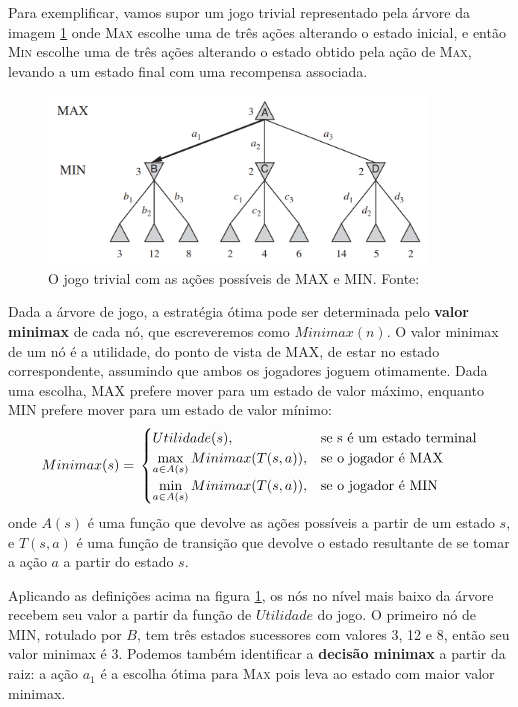 Para exemplificar, vamos supor um jogo trivial representado pela árvore da imagem \ref{minimax} onde \textsc{Max} escolhe uma de três ações alterando o estado inicial, e então \textsc{Min} escolhe uma de três ações alterando o estado obtido pela ação de \textsc{Max}, levando a um estado final com uma recompensa associada.

\begin{figure}[!h]
        \centering
            \includegraphics[width=0.9\textwidth]{picstcc/minimax.png}
            \caption{O jogo trivial com as ações possíveis de MAX e MIN. Fonte: \cite[p. 164]{livro}}
            \label{minimax}
\end{figure}

Dada a árvore de jogo, a estratégia ótima pode ser determinada pelo \textbf{valor minimax} de cada nó, que escreveremos como $Minimax(n)$. O valor minimax de um nó é a utilidade, do ponto de vista de MAX, de estar no estado correspondente, assumindo que ambos os jogadores joguem otimamente. Dada uma escolha, MAX prefere mover para um estado de valor máximo, enquanto MIN prefere mover para um estado de valor mínimo:
\begin{equation*}
  Minimax(s) = \\
  \begin{cases} Utilidade(s), &\textrm{se s é um estado terminal}\\
                \max\limits_{a\in A(s)}Minimax(T(s,a)), &\textrm{se o jogador é MAX}\\
                \min\limits_{a\in A(s)}Minimax(T(s,a)), &\textrm{se o jogador é MIN}\\
  \end{cases}
\end{equation*}
onde $A(s)$ é uma função que devolve as ações possíveis a partir de um estado $s$, e $T(s, a)$ é uma função de transição que devolve o estado resultante de se tomar a ação $a$ a partir do estado $s$.

Aplicando as definições acima na figura \ref{minimax}, os nós no nível mais baixo da árvore recebem seu valor a partir da função de $Utilidade$ do jogo. O primeiro nó de MIN, rotulado por $B$, tem três estados sucessores com valores 3, 12 e 8, então seu valor minimax é 3. Podemos também identificar a \textbf{decisão minimax} a partir da raiz: a ação $a_1$ é a escolha ótima para \textsc{Max} pois leva ao estado com maior valor minimax.
